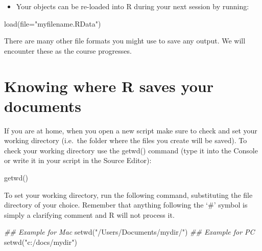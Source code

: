 \documentclass[
  letterpaper,
  DIV=11,
  numbers=noendperiod]{scrreprt}
\newenvironment{Shaded}{\begin{snugshade}}{\end{snugshade}}
\newcommand{\AttributeTok}[1]{\textcolor[rgb]{0.40,0.45,0.13}{#1}}
\newcommand{\DocumentationTok}[1]{\textcolor[rgb]{0.37,0.37,0.37}{\textit{#1}}}
\newcommand{\FunctionTok}[1]{\textcolor[rgb]{0.28,0.35,0.67}{#1}}
\newcommand{\NormalTok}[1]{\textcolor[rgb]{0.00,0.23,0.31}{#1}}
\newcommand{\StringTok}[1]{\textcolor[rgb]{0.13,0.47,0.30}{#1}}
\providecommand{\tightlist}{%
  \setlength{\itemsep}{0pt}\setlength{\parskip}{0pt}}\usepackage{longtable,booktabs,array}
\begin{document}
\begin{itemize}
\tightlist
\item
  Your objects can be re-loaded into R during your next session by
  running:
\end{itemize}

\begin{Shaded}
\begin{Highlighting}[]
\FunctionTok{load}\NormalTok{(}\AttributeTok{file=}\StringTok{"myfilename.RData"}\NormalTok{)}
\end{Highlighting}
\end{Shaded}

There are many other file formats you might use to save any output. We
will encounter these as the course progresses.

\hypertarget{knowing-where-r-saves-your-documents}{%
\section*{Knowing where R saves your
documents}\label{knowing-where-r-saves-your-documents}}

If you are at home, when you open a new script make sure to check and
set your working directory (i.e.~the folder where the files you create
will be saved). To check your working directory use the getwd() command
(type it into the Console or write it in your script in the Source
Editor):

\begin{Shaded}
\begin{Highlighting}[]
\FunctionTok{getwd}\NormalTok{()}
\end{Highlighting}
\end{Shaded}

To set your working directory, run the following command, substituting
the file directory of your choice. Remember that anything following the
`\#' symbol is simply a clarifying comment and R will not process it.

\begin{Shaded}
\begin{Highlighting}[]
\DocumentationTok{\#\# Example for Mac }
\FunctionTok{setwd}\NormalTok{(}\StringTok{"/Users/Documents/mydir/"}\NormalTok{) }
\DocumentationTok{\#\# Example for PC }
\FunctionTok{setwd}\NormalTok{(}\StringTok{"c:/docs/mydir"}\NormalTok{) }
\end{Highlighting}
\end{Shaded}
\end{document}
